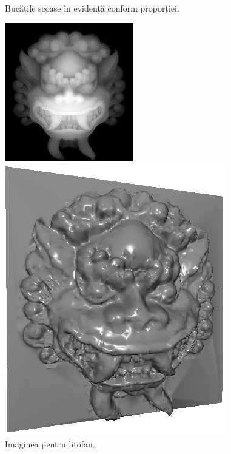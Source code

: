 \documentclass[12pt]{article}
\begin{document}
\begin{figure}[!htb]
\begin{minipage}{0.24\textwidth}
		\caption{Bucățile scoase în evidență conform proporției.}\label{fig:fig9}
	\end{minipage}\hfill
        \begin{minipage}{0.24\textwidth}
		\centering
		\includegraphics[width=.95\linewidth]{Lithophane/LithophaneImg.jpg}
		\caption{Imaginea pentru litofan.}\label{fig:fig10}
	\end{minipage}\hfill
	\begin{minipage}{0.24\textwidth}
		\centering
		\includegraphics[width=.95\linewidth]{Lithophane/LithophaneMesh.png}

\end{minipage}
\end{figure}
\end{document}
